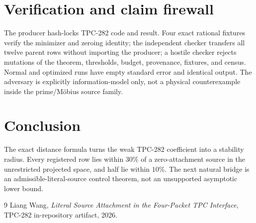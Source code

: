\documentclass[11pt]{article}
\begin{document}
\section{Verification and claim firewall}
The producer hash-locks TPC-282 code and result.  Four exact rational fixtures
verify the minimizer and zeroing identity; the independent checker transfers
all twelve parent rows without importing the producer; a hostile checker
rejects mutations of the theorem, thresholds, budget, provenance, fixtures,
and census.  Normal and optimized runs have empty standard error and identical
output.  The adversary is explicitly information-model only, not a physical
counterexample inside the prime/Möbius source family.
\section{Conclusion}
The exact distance formula turns the weak TPC-282 coefficient into a stability
radius.  Every registered row lies within $30\%$ of a zero-attachment source
in the unrestricted projected space, and half lie within $10\%$.  The next
natural bridge is an admissible-literal-source control theorem, not an
unsupported asymptotic lower bound.
\begin{thebibliography}{9}
 Liang Wang, \emph{Literal Source Attachment in the Four-Packet
TPC Interface}, TPC-282 in-repository artifact, 2026.
\end{thebibliography}
\end{document}
